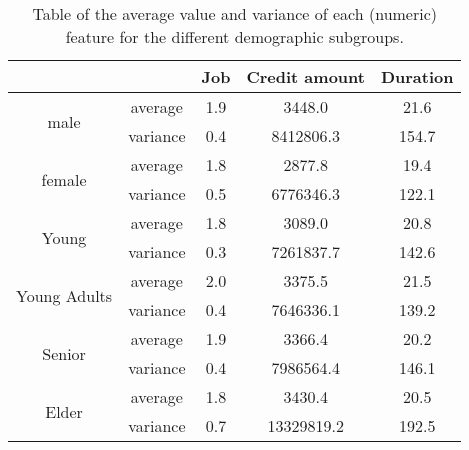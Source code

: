 \documentclass[conference]{IEEEtran}
\begin{document}
\begin{table}[h]
\begin{center}
\caption{Table of the average value and variance of each (numeric) feature for the different demographic subgroups.}
\begin{tabular}{ |c|c|c|c|c| } 
    \hline
    & & Job   & Credit amount & Duration\\ 
    \hline
    \multirow{2}{4em}{male} 
    & average & 1.9 & 3448.0 & 21.6 \\ 
    & variance & 0.4 & 8412806.3 & 154.7 \\ 
    \hline
    \multirow{2}{4em}{female} 
    & average & 1.8 & 2877.8 & 19.4 \\ 
    & variance & 0.5 & 6776346.3 & 122.1 \\
    \hline
    \multirow{2}{4em}{Young} 
    & average & 1.8 & 3089.0 & 20.8 \\ 
    & variance & 0.3 & 7261837.7 & 142.6 \\
    \hline
    \multirow{2}{4em}{Young Adults} 
    & average & 2.0 & 3375.5 & 21.5\\ 
    & variance & 0.4 & 7646336.1 & 139.2 \\
    \hline
    \multirow{2}{4em}{Senior} 
    & average & 1.9 & 3366.4 & 20.2 \\ 
    & variance & 0.4 & 7986564.4 & 146.1 \\
    \hline
    \multirow{2}{4em}{Elder} 
    & average & 1.8 & 3430.4 & 20.5\\ 
    & variance & 0.7 & 13329819.2 & 192.5\\
    \hline
\end{tabular}
\label{table:2}
\end{center}
\end{table}
\end{document}
